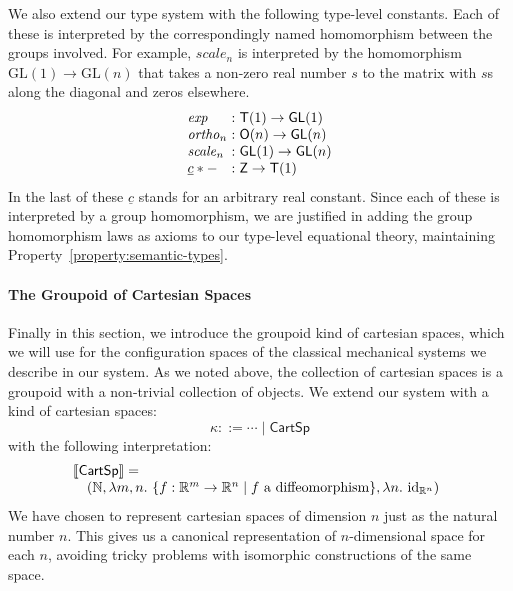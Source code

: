 \documentclass{sigplanconf}
\newcommand{\sepbar}{\mathrel|}
\theoremstyle{examplestyle}
\newcommand{\sem}[1]{\llbracket #1 \rrbracket}
\begin{document}
We also extend our type system with the following type-level
constants. Each of these is interpreted by the correspondingly named
homomorphism between the groups involved. For example,
$\mathit{scale}_n$ is interpreted by the homomorphism $\mathrm{GL}(1)
\to \mathrm{GL}(n)$ that takes a non-zero real number $s$ to the
matrix with $s$s along the diagonal and zeros elsewhere.
\begin{displaymath}
  \begin{array}{l@{\hspace{0.3em}}c@{\hspace{0.3em}}l}
    \mathit{exp} &:& \mathsf{T}(1) \to \mathsf{GL}(1) \\
    \mathit{ortho}_n &:& \mathsf{O}(n) \to \mathsf{GL}(n) \\
    \mathit{scale}_n &:& \mathsf{GL}(1) \to \mathsf{GL}(n) \\
    \underline{c}*- &:& \mathsf{Z} \to \mathsf{T}(1) 
  \end{array}
\end{displaymath}
In the last of these $\underline{c}$ stands for an arbitrary real
constant.  Since each of these is interpreted by a group homomorphism,
we are justified in adding the group homomorphism laws as axioms to
our type-level equational theory, maintaining
Property~\ref{property:semantic-types}.

\paragraph{The Groupoid of Cartesian Spaces} Finally in this section,
we introduce the groupoid kind of cartesian spaces, which we will use
for the configuration spaces of the classical mechanical systems we
describe in our system. As we noted above, the collection of cartesian
spaces is a groupoid with a non-trivial collection of objects. We
extend our system with a kind of cartesian spaces:
\begin{displaymath}
  \kappa ::= \cdots \sepbar \mathsf{CartSp}
\end{displaymath}
with the following interpretation:
\begin{displaymath}
  \begin{array}{@{}l}
    \sem{\mathsf{CartSp}} = \\
    \quad (\mathbb{N}, \lambda m,n.~\{ f : \mathbb{R}^m \to \mathbb{R}^n \sepbar f\textrm{ a diffeomorphism}\}, \lambda n.~\mathrm{id}_{\mathbb{R}^n})
  \end{array}
\end{displaymath}
We have chosen to represent cartesian spaces of dimension $n$ just as
the natural number $n$. This gives us a canonical representation of
$n$-dimensional space for each $n$, avoiding tricky problems with
isomorphic constructions of the same space.
\end{document}
